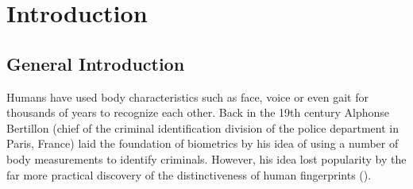 \chapter{Introduction}
\label{introduction}



\section{General Introduction}
Humans have used body characteristics such as face, voice or even gait for thousands of years to recognize each other. Back in the 19th century Alphonse Bertillon (chief of the criminal identification division of the police department in Paris, France) laid the foundation of biometrics by his idea of using a number of body measurements to identify criminals. However, his idea lost popularity by the far more practical discovery of the distinctiveness of human fingerprints (\cite{jain_biometrics}).

